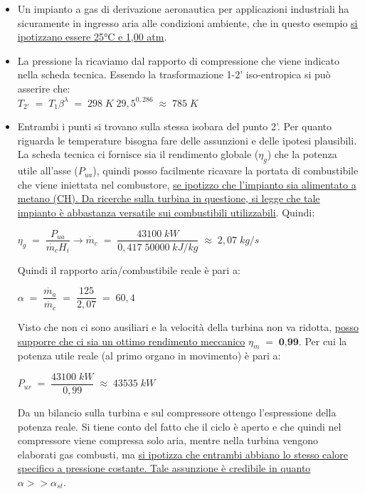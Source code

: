 \documentclass[a4paper, twoside, 12pt]{report}
\begin{document}
\begin{itemize}
	\item[\textbf{Stato 1  }] Un impianto a gas di derivazione aeronautica per applicazioni industriali ha sicuramente in ingresso aria alle condizioni ambiente, che in questo esempio \uline{si ipotizzano essere 25°C e 1,00 atm}. 
	\item[\textbf{Stato 2'}] La pressione la ricaviamo dal rapporto di compressione che viene indicato nella scheda tecnica. Essendo la trasformazione 1-2' iso-entropica si può asserire che:\\
	$T_{2'}\;=\;T_{1}\beta^{\lambda}\;=\;298\;K\;29,5^{0,286}\;\approx\;785\;K$
	\item[\textbf{Stato 2 e 3  }] Entrambi i punti si trovano sulla stessa isobara del punto 2'. Per quanto riguarda le temperature bisogna fare delle assunzioni e delle ipotesi plausibili.\\
	La scheda tecnica ci fornisce sia il rendimento globale ($\eta_{g}$) che la potenza utile all'asse ($P_{ua}$), quindi posso facilmente ricavare la portata di combustibile che viene iniettata nel combustore, \uline{se ipotizzo che l'impianto sia alimentato a metano (CH). Da ricerche sulla turbina in questione, si legge che tale impianto è abbastanza versatile sui combustibili utilizzabili}. Quindi:
	\begin{center}
		$\eta_{g}\;=\;\dfrac{P_{ua}}{\dot{m_{c}}H_{i}}\to\dot{m_{c}}\;=\;\dfrac{43100\;kW}{0,417\;50000\;kJ/kg}\;\approx\;2,07\;kg/s $
	\end{center}
	Quindi il rapporto aria/combustibile reale è pari a:
	\begin{center}
		$\alpha\;=\;\dfrac{\dot{m_{a}}}{\dot{m_{c}}}\;=\;\dfrac{125}{2,07}\;=\;60,4$
	\end{center}
	Visto che non ci sono ausiliari e la velocità della turbina non va ridotta, \uline{posso supporre che ci sia un ottimo rendimento meccanico} $\eta_{m}\;=\;\textbf{0,99}$. Per cui la potenza utile reale (al primo organo in movimento) è pari a:
	\begin{center}
		$P_{ur}\;=\;\dfrac{43100\;kW}{0,99}\;\approx\;43535\;kW$
	\end{center}
	Da un bilancio sulla turbina e sul compressore ottengo l'espressione della potenza reale. Si tiene conto del fatto che il ciclo è aperto e che quindi nel compressore viene compressa solo aria, mentre nella turbina vengono elaborati gas combusti, ma \uline{si ipotizza che entrambi abbiano lo stesso calore specifico a pressione costante. Tale assunzione è credibile in quanto} $\alpha >> \alpha_{st}$.

\end{itemize}
\end{document}
